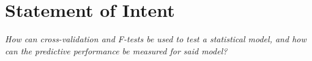 \section{Statement of Intent}

\begin{center}
    \textit{How can cross-validation and F-tests be used to test a statistical model, and how can the predictive performance be measured for said model?}
\end{center}